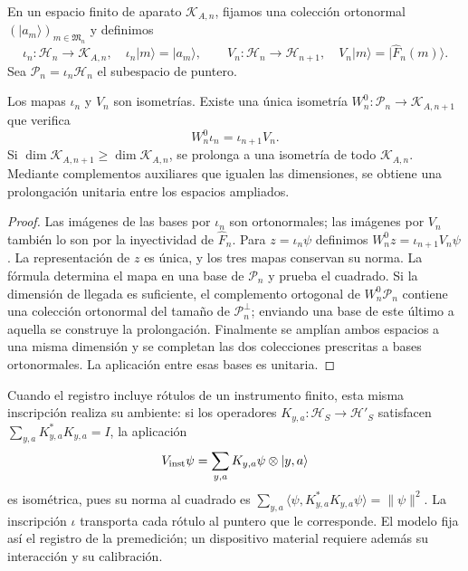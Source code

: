 En un espacio finito de aparato \(\mathcal K_{A,n}\), fijamos una
colección ortonormal \((|a_m\rangle)_{m\in\mathfrak M_n}\) y definimos
\[
 \iota_n:\mathcal H_n\longrightarrow\mathcal K_{A,n},
 \quad \iota_n|m\rangle=|a_m\rangle,
 \qquad
 V_n:\mathcal H_n\longrightarrow\mathcal H_{n+1},
 \quad V_n|m\rangle=|\widehat F_n(m)\rangle.
\]
Sea \(\mathcal P_n=\iota_n\mathcal H_n\) el subespacio de puntero.

\begin{theorem}
\label{vii:thm:observador-entrelazador}
Los mapas \(\iota_n\) y \(V_n\) son isometrías. Existe una única
isometría \(W_n^0:\mathcal P_n\longrightarrow\mathcal K_{A,n+1}\)
que verifica
\begin{equation}
 W_n^0\iota_n=\iota_{n+1}V_n.
 \label{vii:eq:observador-cuadrado}
\end{equation}
Si \(\dim\mathcal K_{A,n+1}\geq\dim\mathcal K_{A,n}\),
se prolonga a una isometría de todo \(\mathcal K_{A,n}\).
Mediante complementos auxiliares que igualen las dimensiones, se obtiene
una prolongación unitaria entre los espacios ampliados.
\end{theorem}

\begin{proof}
Las imágenes de las bases por \(\iota_n\) son ortonormales; las
imágenes por \(V_n\) también lo son por la inyectividad de
\(\widehat F_n\). Para \(z=\iota_n\psi\) definimos
\(W_n^0z=\iota_{n+1}V_n\psi\). La representación de \(z\) es única,
y los tres mapas conservan su norma. La fórmula determina el mapa en
una base de \(\mathcal P_n\) y prueba el cuadrado.
Si la dimensión de llegada es suficiente, el complemento ortogonal de
\(W_n^0\mathcal P_n\) contiene una colección ortonormal del tamaño de
\(\mathcal P_n^\perp\); enviando una base de este último a aquella
se construye la prolongación. Finalmente se amplían ambos espacios a
una misma dimensión y se completan las dos colecciones prescritas a bases
ortonormales. La aplicación entre esas bases es unitaria.
\end{proof}

Cuando el registro incluye rótulos de un instrumento finito, esta misma
inscripción realiza su ambiente: si los operadores
\(K_{y,a}:\mathcal H_S\to\mathcal H'_S\) satisfacen
\(\sum_{y,a}K_{y,a}^*K_{y,a}=I\), la aplicación
\[
 V_{\rm inst}\psi=\sum_{y,a}K_{y,a}\psi\otimes|y,a\rangle
\]
es isométrica, pues su norma al cuadrado es
\(\sum_{y,a}\langle\psi,K_{y,a}^*K_{y,a}\psi\rangle=\|\psi\|^2\).
La inscripción \(\iota\) transporta cada rótulo al puntero que le
corresponde. El modelo fija así el registro de la premedición; un
dispositivo material requiere además su interacción y su calibración.

